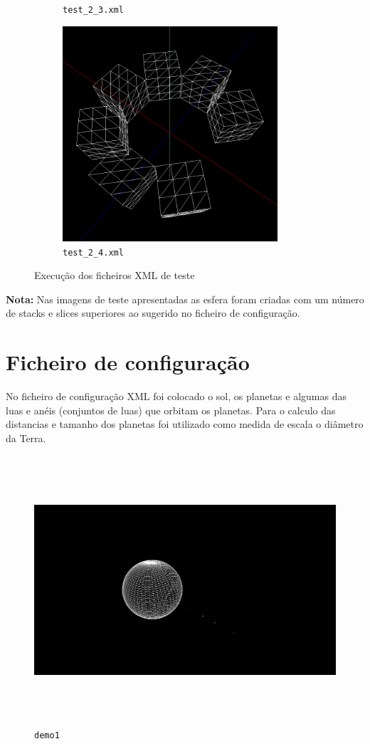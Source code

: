 \documentclass[11pt,a4paper]{report}
\begin{document}
\begin{figure}[H]
\begin{subfigure}{0.5\textwidth}
  \caption{\texttt{test\_2\_3.xml}}
  \label{fig:snowman}
\end{subfigure}%
\begin{subfigure}{0.5\textwidth}
  \centering
  \includegraphics[width = 8cm,height = 8cm]{boxes.png}
  \caption{\texttt{test\_2\_4.xml}}
  \label{fig:sboxes}
\end{subfigure}
\label{fig:plano}
\caption{Execução dos ficheiros XML de teste}
\end{figure}
\textbf{Nota:} Nas imagens de teste apresentadas as esfera foram criadas com um número de stacks e slices superiores ao sugerido no ficheiro de configuração.


\newpage
\section{Ficheiro de configuração}
No ficheiro de configuração XML foi colocado o sol, os planetas e algumas das luas e anéis (conjuntos de luas) que orbitam os planetas. Para o calculo das distancias e tamanho dos planetas foi utilizado como medida de escala o diâmetro da Terra.

\vspace{1cm}
\begin{figure}[H]
\centering
\includegraphics[width = 15cm,height = 10cm]{1.png}
\caption{\texttt{demo1}}
\label{fig:demo1}
\end{figure}
\end{document}
